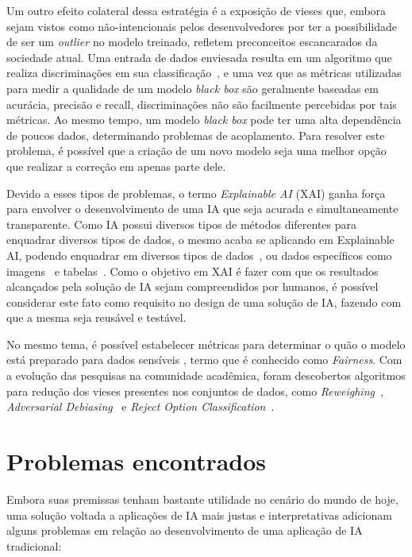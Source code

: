 \documentclass[portugues]{ic-tese}
\begin{document}
Um outro efeito colateral dessa estratégia é a exposição de vieses que, embora sejam vistos como não-intencionais pelos desenvolvedores por ter a possibilidade de ser um \textit{outlier} no modelo treinado, refletem preconceitos escancarados da sociedade atual. Uma entrada de dados enviesada resulta em um algoritmo que realiza discriminações em sua classificação~\citep{Buolamwini_2018}, e uma vez que as métricas utilizadas para medir a qualidade de um modelo \textit{black box} são geralmente baseadas em acurácia, precisão e recall, discriminações não são facilmente percebidas por tais métricas. Ao mesmo tempo, um modelo \textit{black box} pode ter uma alta dependência de poucos dados, determinando problemas de acoplamento. Para resolver este problema, é possível que a criação de um novo modelo seja uma melhor opção que realizar a correção em apenas parte dele.

Devido a esses tipos de problemas, o termo \textit{Explainable AI} (XAI) ganha força para envolver o desenvolvimento de uma IA que seja acurada e simultaneamente transparente. Como IA possui diversos tipos de métodos diferentes para enquadrar diversos tipos de dados, o mesmo acaba se aplicando em Explainable AI, podendo enquadrar em diversos tipos de dados~\citep{Sundararajan_2017}, ou dados específicos como imagens~\citep{Kapishnikov_2019} e tabelas~\citep{Maleki_2013}. Como o objetivo em XAI é fazer com que os resultados alcançados pela solução de IA sejam compreendidos por humanos, é possível considerar este fato como requisito no design de uma solução de IA, fazendo com que a mesma seja reusável e testável.

No mesmo tema, é possível estabelecer métricas para determinar o quão o modelo está preparado para dados sensíveis \citep{Begley_2021}, termo que é conhecido como \textit{Fairness}. Com a evolução das pesquisas na comunidade acadêmica, foram descobertos algoritmos para redução dos vieses presentes nos conjuntos de dados, como \textit{Reweighing}~\citep{Kamiran_2011}, \textit{Adversarial Debiasing}~\citep{Zhang_2018} e \textit{Reject Option Classification}~\citep{Kamiran_2012}.

\section{Problemas encontrados}

Embora suas premissas tenham bastante utilidade no cenário do mundo de hoje, uma solução voltada a aplicações de IA mais justas e interpretativas adicionam alguns problemas em relação ao desenvolvimento de uma aplicação de IA tradicional:
\end{document}
